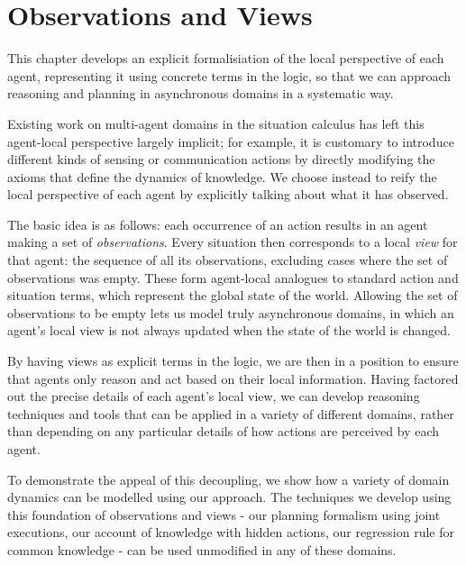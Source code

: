 

\chapter{Observations and Views}

\label{ch:observations}

This chapter develops an explicit formalisiation of the local perspective
of each agent, representing it using concrete terms in the logic,
so that we can approach reasoning and planning in asynchronous domains
in a systematic way.

Existing work on multi-agent domains in the situation calculus has
left this agent-local perspective largely implicit; for example, it
is customary to introduce different kinds of sensing or communication
actions by directly modifying the axioms that define the dynamics
of knowledge. We choose instead to reify the local perspective of
each agent by explicitly talking about what it has observed.

The basic idea is as follows: each occurrence of an action results
in an agent making a set of \emph{observations}. Every situation then
corresponds to a local \emph{view} for that agent: the sequence of
all its observations, excluding cases where the set of observations
was empty. These form agent-local analogues to standard action and
situation terms, which represent the global state of the world. Allowing
the set of observations to be empty lets us model truly asynchronous
domains, in which an agent's local view is not always updated when
the state of the world is changed.

By having views as explicit terms in the logic, we are then in a position
to ensure that agents only reason and act based on their local information.
Having factored out the precise details of each agent's local view,
we can develop reasoning techniques and tools that can be applied
in a variety of different domains, rather than depending on any particular
details of how actions are perceived by each agent.

To demonstrate the appeal of this decoupling, we show how a variety
of domain dynamics can be modelled using our approach. The techniques
we develop using this foundation of observations and views - our planning
formalism using joint executions, our account of knowledge with hidden
actions, our regression rule for common knowledge - can be used unmodified
in any of these domains.


